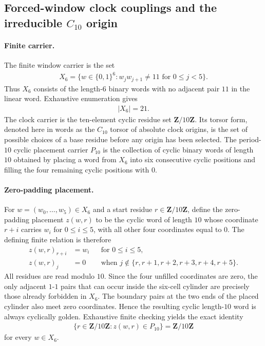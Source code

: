 
\subsection{Forced-window clock couplings and the irreducible $C_{10}$ origin}
\label{sec:window6-clock-coupling-cert-c10-torsor-origin-irreducible}

\paragraph{Finite carrier.}
The finite window carrier is the set
$$
\begin{aligned}
X_6=\{w\in \{0,1\}^6 : w_jw_{j+1}\ne 11\text{ for }0\le j<5\}.
\end{aligned}
$$
Thus $X_6$ consists of the length-$6$ binary words with no adjacent pair $11$ in the linear word. Exhaustive enumeration gives
$$
\begin{aligned}
|X_6|=21.
\end{aligned}
$$
The clock carrier is the ten-element cyclic residue set $\mathbf{Z}/10\mathbf{Z}$. Its torsor form, denoted here in words as the $C_{10}$ torsor of absolute clock origins, is the set of possible choices of a base residue before any origin has been selected. The period-$10$ cyclic placement carrier $P_{10}$ is the collection of cyclic binary words of length $10$ obtained by placing a word from $X_6$ into six consecutive cyclic positions and filling the four remaining cyclic positions with $0$.

\paragraph{Zero-padding placement.}
For $w=(w_0,\ldots,w_5)\in X_6$ and a start residue $r\in \mathbf{Z}/10\mathbf{Z}$, define the zero-padding placement $z(w,r)$ to be the cyclic word of length $10$ whose coordinate $r+i$ carries $w_i$ for $0\le i\le 5$, with all other four coordinates equal to $0$. The defining finite relation is therefore
$$
\begin{aligned}
z(w,r)_{r+i}&=w_i &&\text{for }0\le i\le 5,\\
z(w,r)_j&=0 &&\text{when }j\notin \{r,r+1,r+2,r+3,r+4,r+5\}.
\end{aligned}
$$
All residues are read modulo $10$. Since the four unfilled coordinates are zero, the only adjacent $1$-$1$ pairs that can occur inside the six-cell cylinder are precisely those already forbidden in $X_6$. The boundary pairs at the two ends of the placed cylinder also meet zero coordinates. Hence the resulting cyclic length-$10$ word is always cyclically golden. Exhaustive finite checking yields the exact identity
$$
\begin{aligned}
\{r\in \mathbf{Z}/10\mathbf{Z}: z(w,r)\in P_{10}\}=\mathbf{Z}/10\mathbf{Z}
\end{aligned}
$$
for every $w\in X_6$.

